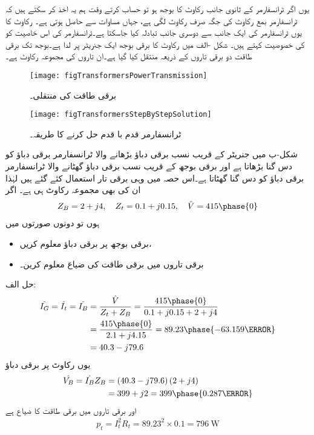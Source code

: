 	یوں اگر ٹرانسفارمر کے ثانوی جانب  رکاوٹ  کا بوجھ ہو تو حساب کرتے وقت ہم یہ اخذ کر سکتے ہیں کہ  ٹرانسفارمر بمع رکاوٹ  کی  جگہ  صرف   رکاوٹ لگی ہے، جہاں  مساوات   سے حاصل ہوتی ہے۔ رکاوٹ کا یوں ٹرانسفارمر کی ایک جانب سے دوسری جانب تبادلہ کیا جاسکتا ہے۔ٹرانسفارمر کی اس خاصیت کو   کی خصوصیت  کہتے ہیں۔
%
شکل -الف میں رکاوٹ  کا برقی بوجھ ایک جنریٹر پر لدا ہے۔بوجھ تک برقی طاقت دو برقی تاروں کے ذریعہ منتقل کیا گیا ہے۔ان تاروں کی مجموعہ رکاوٹ  ہے۔
\begin{figure}
\centering
\texttt{[image: figTransformersPowerTransmission]}
\caption{برقی طاقت کی منتقلی۔}
\label{شکل_ٹرانسفارمر_برقی_طاقت_کی_منتقلی}
\end{figure}
%
\begin{figure}
\centering
\texttt{[image: figTransformersStepByStepSolution]}
\caption{ٹرانسفارمر قدم با قدم حل کرنے کا طریقہ۔}
\label{شکل_ٹرانسفارمر_قدم_با_قدم_حل}
\end{figure}

شکل-ب میں جنریٹر کے قریب نسب برقی دباؤ بڑھانے والا ٹرانسفارمر برقی دباؤ کو دس گنا بڑھاتا ہے اور برقی بوجھ کے قریب نسب برقی دباؤ گھٹانے والا ٹرانسفارمر برقی دباؤ کو دس گنا گھٹاتا ہے۔اس حصہ میں وہی برقی تار استعمال کئے گئے ہیں لہٰذا ان کی بھی مجموعہ رکاوٹ  ہی ہے۔
اگر 
\begin{align*}
Z_B=2+j 4, \quad Z_t=0.1 +j 0.15, \quad \hat{V}=415\phase{0}
\end{align*}
ہوں تو دونوں صورتوں میں
\begin{itemize}
\item
برقی بوجھ پر برقی دباؤ معلوم کریں،
\item
برقی تاروں میں برقی طاقت کی ضیاع معلوم کرین۔
\end{itemize}

حل الف:
\begin{align*}
\hat{I_G}=\hat{I_t}=\hat{I_B}&=\frac{\hat{V}}{Z_t+Z_B}=\frac{415\phase{0}}{0.1+j 0.15+2+j 4}\\
&=\frac{415\phase{0}}{2.1+j 4.15}=89.23\phase{-63.159\degree}\\
&=40.3-j79.6
\end{align*}
یوں رکاوٹ پر برقی دباؤ
\begin{align*}
\hat{V_B}=\hat{I_B} Z_B&=\left(40.3-j79.6 \right) \left( 2+j 4\right)\\
&=399+j2=399\phase{0.287\degree}
\end{align*}
اور برقی تاروں میں برقی طاقت کا ضیاع ہے
\begin{align*}
p_t=I_t^2 R_t=89.23^2 \times 0.1=\SI{796}{\watt}
\end{align*}


